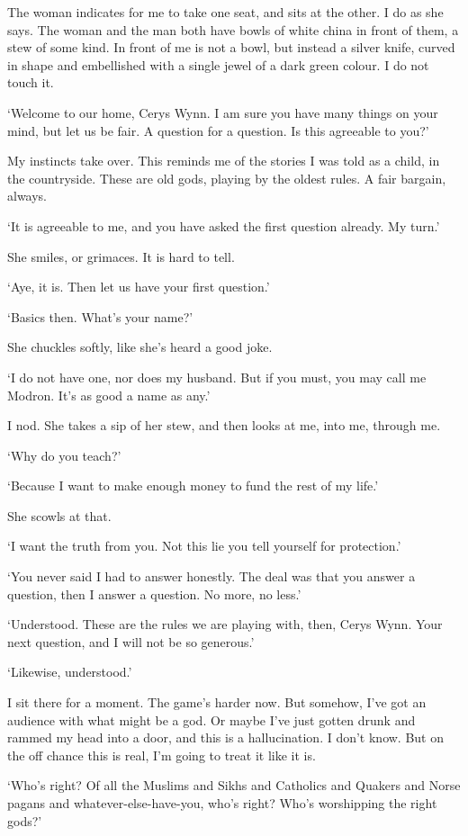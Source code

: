 The woman indicates for me to take one seat, and sits at the other. I
do as she says. The woman and the man both have bowls of white china
in front of them, a stew of some kind. In front of me is not a bowl,
but instead a silver knife, curved in shape and embellished with a
single jewel of a dark green colour. I do not touch it.

`Welcome to our home, Cerys Wynn. I am sure you have many things on
your mind, but let us be fair. A question for a question. Is this
agreeable to you?'

My instincts take over. This reminds me of the stories I was told as a
child, in the countryside. These are old gods, playing by the oldest
rules. A fair bargain, always.

`It is agreeable to me, and you have asked the first question
already. My turn.'

She smiles, or grimaces. It is hard to tell.

`Aye, it is. Then let us have your first question.'

`Basics then. What’s your name?'

She chuckles softly, like she’s heard a good joke.

`I do not have one, nor does my husband. But if you must, you may call
me Modron. It’s as good a name as any.'

I nod. She takes a sip of her stew, and then looks at me, into me,
through me.

`Why do you teach?'

`Because I want to make enough money to fund the rest of my life.'

She scowls at that.

`I want the truth from you. Not this lie you tell yourself for
protection.'

`You never said I had to answer honestly. The deal was that you answer
a question, then I answer a question. No more, no less.'

`Understood. These are the rules we are playing with, then, Cerys
Wynn. Your next question, and I will not be so generous.'

`Likewise, understood.'

I sit there for a moment. The game’s harder now. But somehow, I’ve got
an audience with what might be a god. Or maybe I’ve just gotten drunk
and rammed my head into a door, and this is a hallucination. I don’t
know. But on the off chance this is real, I’m going to treat it like
it is.

`Who’s right? Of all the Muslims and Sikhs and Catholics and Quakers
and Norse pagans and whatever-else-have-you, who’s right? Who’s
worshipping the right gods?'

